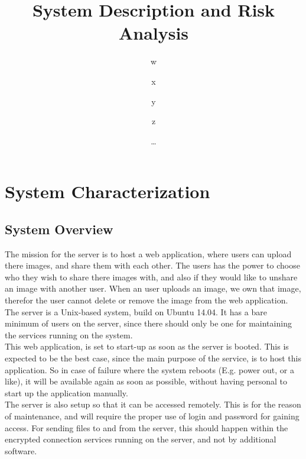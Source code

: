 \documentclass{article}
\title{\huge\sffamily\bfseries System Description and Risk Analysis}
\author{w \and x \and y \and z}
\date{\dots}
\begin{document}
\maketitle


\tableofcontents
\pagebreak


\section{System Characterization}

\subsection{System Overview}

The mission for the server is to host a web application, where users can upload there images, and share them with each other. The users has the power to choose who they wish to share there images with, and also if they would like to unshare an image with another user. When an user uploads an image, we own that image, therefor the user cannot delete or remove the image from the web application. \\

The server is a Unix-based system, build on Ubuntu 14.04. It has a bare minimum of users on the server, since there should only be one for maintaining the services running on the system.\\


This web application, is set to start-up as soon as the server is booted. This is expected to be the best case, since the main purpose of the service, is to host this application. So in case of failure where the system reboots (E.g. power out, or a like), it will be available again as soon as possible, without having personal to start up the application manually.\\

The server is also setup so that it can be accessed remotely. This is for the reason of maintenance, and will require the proper use of login and password for gaining access.
For sending files to and from the server, this should happen within the encrypted connection services running on the server, and not by additional software.
\end{document}
